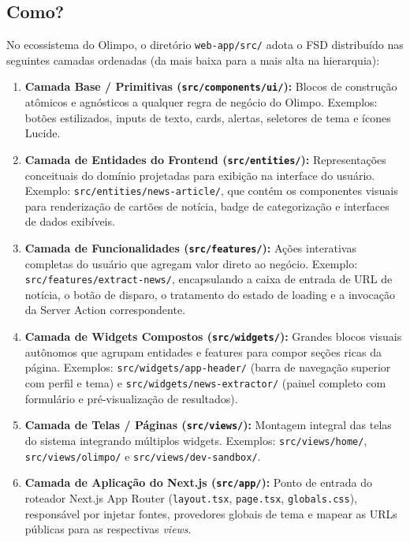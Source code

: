 \documentclass[12pt,a4paper]{article}
\begin{document}
\subsection{Como?}
No ecossistema do Olimpo, o diretório \texttt{web-app/src/} adota o FSD distribuído nas seguintes camadas ordenadas (da mais baixa para a mais alta na hierarquia):
\begin{enumerate}
  \item \textbf{Camada Base / Primitivas (\texttt{src/components/ui/}):}
  Blocos de construção atômicos e agnósticos a qualquer regra de negócio do Olimpo.
  Exemplos: botões estilizados, inputs de texto, cards, alertas, seletores de tema e ícones Lucide.
  \item \textbf{Camada de Entidades do Frontend (\texttt{src/entities/}):}
  Representações conceituais do domínio projetadas para exibição na interface do usuário.
  Exemplo: \texttt{src/entities/news-article/}, que contém os componentes visuais para renderização de cartões de notícia, badge de categorização e interfaces de dados exibíveis.
  \item \textbf{Camada de Funcionalidades (\texttt{src/features/}):}
  Ações interativas completas do usuário que agregam valor direto ao negócio.
  Exemplo: \texttt{src/features/extract-news/}, encapsulando a caixa de entrada de URL de notícia, o botão de disparo, o tratamento do estado de loading e a invocação da Server Action correspondente.
  \item \textbf{Camada de Widgets Compostos (\texttt{src/widgets/}):}
  Grandes blocos visuais autônomos que agrupam entidades e features para compor seções ricas da página.
  Exemplos: \texttt{src/widgets/app-header/} (barra de navegação superior com perfil e tema) e \texttt{src/widgets/news-extractor/} (painel completo com formulário e pré-visualização de resultados).
  \item \textbf{Camada de Telas / Páginas (\texttt{src/views/}):}
  Montagem integral das telas do sistema integrando múltiplos widgets.
  Exemplos: \texttt{src/views/home/}, \texttt{src/views/olimpo/} e \texttt{src/views/dev-sandbox/}.
  \item \textbf{Camada de Aplicação do Next.js (\texttt{src/app/}):}
  Ponto de entrada do roteador Next.js App Router (\texttt{layout.tsx}, \texttt{page.tsx}, \texttt{globals.css}), responsável por injetar fontes, provedores globais de tema e mapear as URLs públicas para as respectivas \textit{views}.
\end{enumerate}
\end{document}
